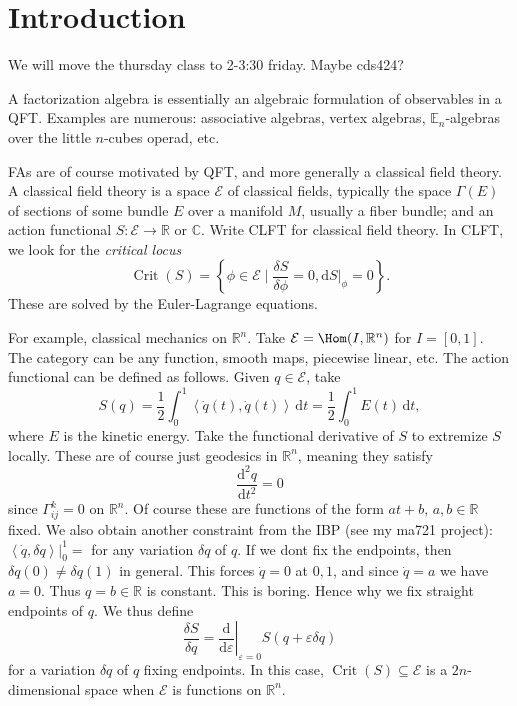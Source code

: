 \chapter{Introduction}



We will move the thursday class to 2-3:30 friday. Maybe cds424?

A factorization algebra is essentially an algebraic formulation of observables in a QFT. Examples are numerous: associative algebras, vertex algebras, $\mathbb{E} _n$-algebras over the little $n$-cubes operad, etc.

FAs are of course motivated by QFT, and more generally a classical field theory. A classical field theory is a space $\mathcal{E} $ of classical fields, typically the space $\Gamma (E)$ of sections of some bundle $E$ over a manifold $M$, usually a fiber bundle; and an action functional $S : \mathcal{E}  \to \mathbb{R} \text{ or } \mathbb{C} $. Write CLFT for classical field theory. In CLFT, we look for the \emph{critical locus}
\[
	\operatorname{Crit} (S)=\left\{ \phi \in \mathcal{E} \mid \frac{\delta S}{\delta \phi } =0 ,\mathrm{d} S|_{\phi } =0\right\} 
.\]
These are solved by the Euler-Lagrange equations.

For example, classical mechanics on $\mathbb{R} ^n$. Take $\mathcal{E} =\Hom(I,\mathbb{R} ^n)$ for $I=[0,1]$. The category can be any function, smooth maps, piecewise linear, etc. The action functional can be defined as follows. Given $q\in \mathcal{E} $, take
\[
	S(q)=\frac{1}{2} \int_{0}^{1} \left\langle \dot{q} (t),\dot{q} (t) \right\rangle  \,\mathrm{d} t=\frac{1}{2} \int_{0}^{1} E(t) \,\mathrm{d} t,
\]
where $E$ is the kinetic energy. Take the functional derivative of $S$ to extremize $S$ locally. These are of course just geodesics in $\mathbb{R} ^n$, meaning they satisfy
\[
	\frac{\mathrm{d}^2q}{\mathrm{d}t^2} =0
\]
since $\Gamma _{ij} ^k=0$ on $\mathbb{R} ^n$. Of course these are functions of the form $at+b$, $a,b\in\mathbb{R} $ fixed. We also obtain another constraint from the IBP (see my ma721 project): $\left\langle \dot{q} ,\delta q \right\rangle|_0^1=$ for any variation $\delta q$ of $q$. If we dont fix the endpoints, then $\delta q(0)\neq \delta q(1)$ in general. This forces $\dot{q} =0$ at $0,1$, and since $\dot{q} =a$ we have $a=0$. Thus $q=b\in\mathbb{R} $ is constant. This is boring. Hence why we fix straight endpoints of $q$. We thus define
\[
	\frac{\delta S}{\delta q} =\left.\frac{\mathrm{d}}{\mathrm{d}\varepsilon } \right|_{\varepsilon =0} S(q+\varepsilon \delta q)
\]
for a variation $\delta q$ of $q$ fixing endpoints. In this case, $\operatorname{Crit} (S)\subseteq \mathcal{E} $ is a $2n$-dimensional space when $\mathcal{E} $ is functions on $\mathbb{R} ^n$.

